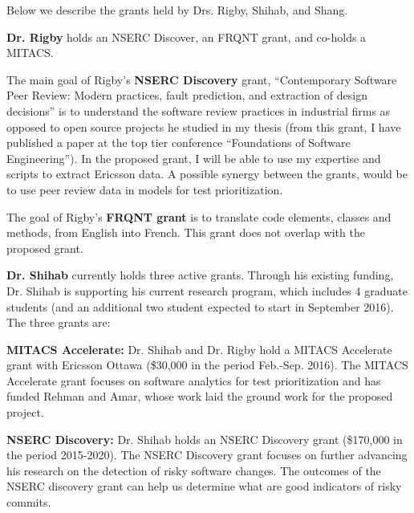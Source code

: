 \documentclass[12pt, letterpaper]{article}
\begin{document}
\fancyhead{}
\pagestyle{fancy}
\renewcommand{\headrulewidth}{0pt}

\begin{center}
\begin{LARGE}
\noindent
{}
\end{LARGE}
\end{center}


Below we describe the grants held by Drs. Rigby, Shihab, and Shang.

\textbf{Dr. Rigby} holds an NSERC Discover, an FRQNT grant, and co-holds a MITACS.

The main goal of Rigby's \textbf{NSERC Discovery} grant, “Contemporary Software Peer Review:
Modern practices, fault prediction, and extraction of design decisions” is to
understand the software review practices in industrial firms as opposed to open
source projects he studied in my thesis (from this grant, I have published a
paper at the top tier conference “Foundations of Software Engineering”). 
%
In the proposed grant, I will be able to use my expertise and scripts to
extract Ericsson data. A possible synergy between the grants, would be to use
peer review data in models for test prioritization. 

The goal of Rigby's \textbf{FRQNT grant} is to translate code elements, classes and methods,
from English into French. This grant does not overlap with the proposed grant.

\textbf{Dr. Shihab} currently holds three active grants. Through his existing funding, Dr. Shihab is supporting his current research program, which includes 4 graduate students (and an additional two student expected to start in September 2016). The three grants are:

\textbf{MITACS Accelerate:} Dr. Shihab and Dr. Rigby hold a MITACS Accelerate grant with Ericsson Ottawa (\$30,000 in the period Feb.-Sep. 2016). The MITACS Accelerate grant focuses on software analytics for test prioritization and has funded Rehman and Amar, whose work laid the ground work for the proposed project.

\textbf{NSERC Discovery:} Dr. Shihab holds an NSERC Discovery grant (\$170,000 in the period 2015-2020). The NSERC Discovery grant focuses on further advancing his research on the detection of risky software changes. The outcomes of the NSERC discovery grant can help us determine what are good indicators of risky commits.
\end{document}
